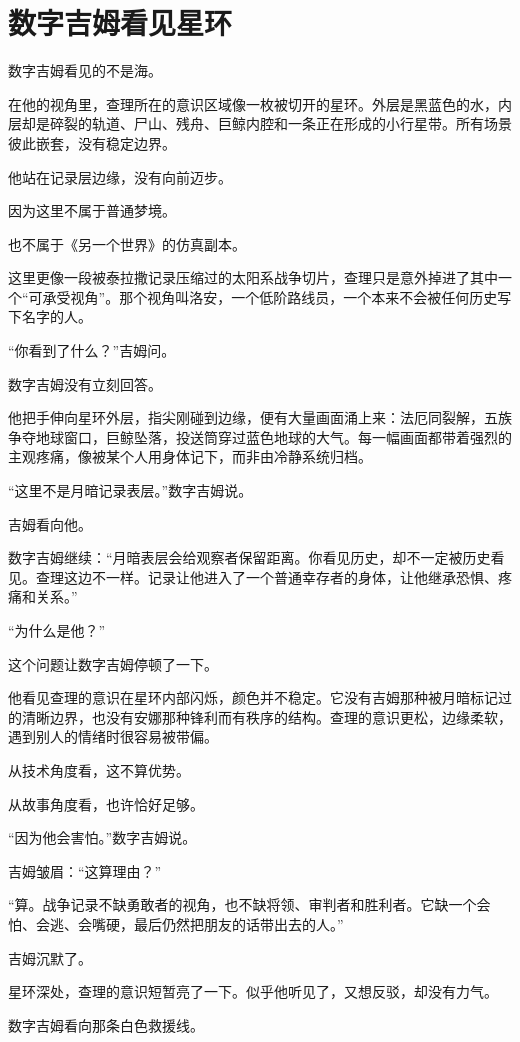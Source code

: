 \chapter{数字吉姆看见星环}

数字吉姆看见的不是海。

在他的视角里，查理所在的意识区域像一枚被切开的星环。外层是黑蓝色的水，内层却是碎裂的轨道、尸山、残舟、巨鲸内腔和一条正在形成的小行星带。所有场景彼此嵌套，没有稳定边界。

他站在记录层边缘，没有向前迈步。

因为这里不属于普通梦境。

也不属于《另一个世界》的仿真副本。

这里更像一段被泰拉撒记录压缩过的太阳系战争切片，查理只是意外掉进了其中一个“可承受视角”。那个视角叫洛安，一个低阶路线员，一个本来不会被任何历史写下名字的人。

“你看到了什么？”吉姆问。

数字吉姆没有立刻回答。

他把手伸向星环外层，指尖刚碰到边缘，便有大量画面涌上来：法厄同裂解，五族争夺地球窗口，巨鲸坠落，投送筒穿过蓝色地球的大气。每一幅画面都带着强烈的主观疼痛，像被某个人用身体记下，而非由冷静系统归档。

“这里不是月暗记录表层。”数字吉姆说。

吉姆看向他。

数字吉姆继续：“月暗表层会给观察者保留距离。你看见历史，却不一定被历史看见。查理这边不一样。记录让他进入了一个普通幸存者的身体，让他继承恐惧、疼痛和关系。”

“为什么是他？”

这个问题让数字吉姆停顿了一下。

他看见查理的意识在星环内部闪烁，颜色并不稳定。它没有吉姆那种被月暗标记过的清晰边界，也没有安娜那种锋利而有秩序的结构。查理的意识更松，边缘柔软，遇到别人的情绪时很容易被带偏。

从技术角度看，这不算优势。

从故事角度看，也许恰好足够。

“因为他会害怕。”数字吉姆说。

吉姆皱眉：“这算理由？”

“算。战争记录不缺勇敢者的视角，也不缺将领、审判者和胜利者。它缺一个会怕、会逃、会嘴硬，最后仍然把朋友的话带出去的人。”

吉姆沉默了。

星环深处，查理的意识短暂亮了一下。似乎他听见了，又想反驳，却没有力气。

数字吉姆看向那条白色救援线。

